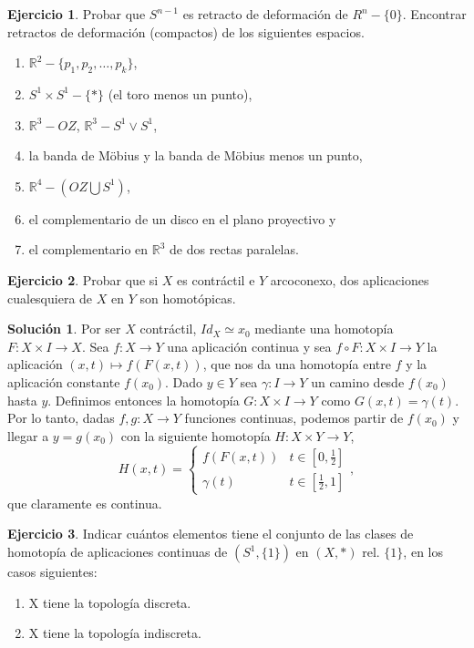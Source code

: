 \documentclass{article}
\theoremstyle{plain}
\theoremstyle{definition}
\newtheorem{exercise}{Ejercicio}
\newtheorem*{sol*}{Solución}
\newcommand{\R}{\mathbb{R}}
\begin{document}
\begin{exercise}
Probar que $S^{n-1}$ es retracto de deformación de $R^n-\{0\}$. Encontrar retractos de deformación (compactos) de los siguientes espacios.
\begin{enumerate}
\item $\R^2-\{p_1,p_2,\dotsc,p_k\}$,
\item $S^1\times S^1-\{*\}$ (el toro menos un punto),
\item $\R^3-OZ$, $\R^3-S^1\lor S^1$,
\item la banda de Möbius y la banda de Möbius menos un punto,
\item $\R^4-(OZ\bigcup S^1)$,
\item el complementario de un disco en el plano proyectivo y
\item el complementario en $\R^3$ de dos rectas paralelas.
\end{enumerate}
\end{exercise}
\newpage
\begin{exercise}
Probar que si $X$ es contráctil e $Y$ arcoconexo, dos aplicaciones cualesquiera de $X$ en $Y$ son homotópicas.
\end{exercise}
\begin{sol*}
Por ser $X$ contráctil, $Id_X\simeq x_0$ mediante una homotopía $F:X\times I\to X$. Sea $f:X\to Y$ una aplicación continua y sea $f\circ F: X\times I\to Y$ la aplicación $(x,t)\mapsto f(F(x,t))$, que nos da una homotopía entre $f$ y la aplicación constante $f(x_0)$. Dado $y\in Y$ sea $\gamma: I\to Y$ un camino desde $f(x_0)$ hasta $y$. Definimos entonces la homotopía $G:X\times I\to Y$ como $G(x,t)=\gamma(t)$. Por lo tanto, dadas $f,g:X\to Y$ funciones continuas, podemos partir de $f(x_0)$ y llegar a $y=g(x_0)$ con la siguiente homotopía $H:X\times Y\to Y$,
$$
H(x,t)=\begin{cases}
f(F(x,t)) & t\in[0,\frac{1}{2}]\\
\gamma(t) & t\in[\frac{1}{2},1]
\end{cases},
$$
que claramente es continua.
\end{sol*}
\newpage
\begin{exercise}
Indicar cuántos elementos tiene el conjunto de las clases de homotopía de aplicaciones continuas de $(S^1,\{1\})$ en $(X,*)$ rel. $\{1\}$, en los casos siguientes:
\begin{enumerate}
\item X tiene la topología discreta.
\item X tiene la topología indiscreta.
\end{enumerate}
\end{exercise}
\end{document}
